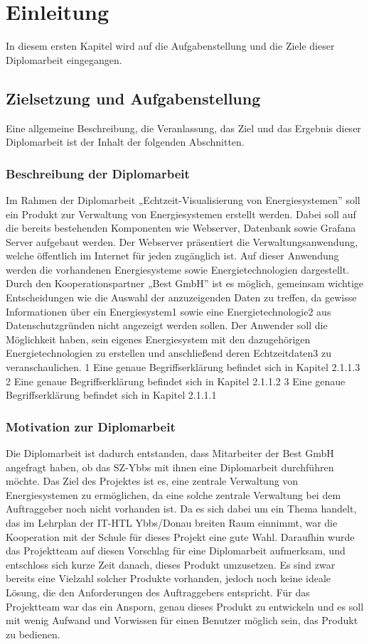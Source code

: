 \chapter{Einleitung}
In diesem ersten Kapitel wird auf die Aufgabenstellung und die Ziele dieser Diplomarbeit eingegangen.


\section{Zielsetzung und Aufgabenstellung}
Eine allgemeine Beschreibung, die Veranlassung, das Ziel und das Ergebnis dieser Diplomarbeit ist der Inhalt der folgenden Abschnitten.


\subsection{Beschreibung der Diplomarbeit}
Im Rahmen der Diplomarbeit „Echtzeit-Visualisierung von Energiesystemen” soll ein Produkt zur Verwaltung von Energiesystemen erstellt werden. Dabei soll auf die bereits bestehenden Komponenten wie Webserver, Datenbank sowie Grafana Server aufgebaut werden. Der Webserver präsentiert die Verwaltungsanwendung, welche öffentlich im Internet für jeden zugänglich ist. Auf dieser Anwendung werden die vorhandenen Energiesysteme sowie Energietechnologien dargestellt.
Durch den Kooperationspartner „Best GmbH” ist es möglich, gemeinsam wichtige Entscheidungen wie die Auswahl der anzuzeigenden Daten zu treffen, da gewisse Informationen über ein Energiesystem1 sowie eine Energietechnologie2 aus Datenschutzgründen nicht angezeigt werden sollen. Der Anwender soll die Möglichkeit haben, sein eigenes Energiesystem mit den dazugehörigen Energietechnologien zu erstellen und anschließend deren Echtzeitdaten3 zu veranschaulichen. 
1 Eine genaue Begriffserklärung befindet sich in Kapitel 2.1.1.3 
2 Eine genaue Begriffserklärung befindet sich in Kapitel 2.1.1.2
3 Eine genaue Begriffserklärung befindet sich in Kapitel 2.1.1.1

\newpage
\subsection{Motivation zur Diplomarbeit}
Die Diplomarbeit ist dadurch entstanden, dass Mitarbeiter der Best GmbH angefragt haben, ob das SZ-Ybbs mit ihnen eine Diplomarbeit durchführen möchte. Das Ziel des Projektes ist es, eine zentrale Verwaltung von Energiesystemen zu ermöglichen, da eine solche zentrale Verwaltung bei dem Auftraggeber noch nicht vorhanden ist.
Da es sich dabei um ein Thema handelt, das im Lehrplan der IT-HTL Ybbs/Donau breiten Raum einnimmt, war die Kooperation mit der Schule für dieses Projekt eine gute Wahl. Daraufhin wurde das Projektteam auf diesen Vorschlag für eine Diplomarbeit aufmerksam, und entschloss sich kurze Zeit danach, dieses Produkt umzusetzen. Es sind zwar bereits eine Vielzahl solcher Produkte vorhanden, jedoch noch keine ideale Lösung, die den Anforderungen des Auftraggebers entspricht. Für das Projektteam war das ein Ansporn, genau dieses Produkt zu entwickeln und es soll mit wenig Aufwand und Vorwissen für einen Benutzer möglich sein, das Produkt zu bedienen.



